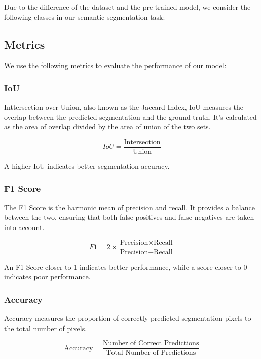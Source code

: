 \documentclass[11pt, a4paper,oneside,chapterprefix=false]{scrbook}
\begin{document}
Due to the difference of the dataset and the pre-trained model, we consider the following classes in our semantic segmentation task:

\subsection{Metrics}

We use the following metrics to evaluate the performance of our model:

\subsubsection{IoU}

Inttersection over Union, also known as the Jaccard Index, IoU measures the overlap between the predicted segmentation and the ground truth. It's calculated as the area of overlap divided by the area of union of the two sets.

\begin{equation}
	IoU = \frac{\text{Intersection}}{\text{Union}}
\end{equation}

A higher IoU indicates better segmentation accuracy.

\subsubsection{F1 Score}

The F1 Score is the harmonic mean of precision and recall. It provides a balance between the two, ensuring that both false positives and false negatives are taken into account.

\begin{equation}
	F1 = 2 \times \frac{\text{Precision} \times \text{Recall}}{\text{Precision} + \text{Recall}}
\end{equation}

An F1 Score closer to 1 indicates better performance, while a score closer to 0 indicates poor performance.

\subsubsection{Accuracy}

Accuracy measures the proportion of correctly predicted segmentation pixels to the total number of pixels.

\begin{equation}
	\text{Accuracy} = \frac{\text{Number of Correct Predictions}}{\text{Total Number of Predictions}}
\end{equation}
\end{document}
